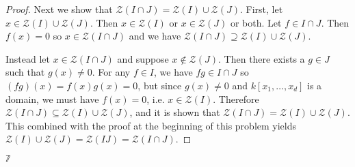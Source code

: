 \documentclass[11pt,oneside,english]{amsart}
\theoremstyle{definition}
\newcommand{\MC}[1]{\mathcal{#1}}
\begin{document}
\begin{enumerate}[leftmargin=*]
\begin{enumerate}
\begin{proof}
Next we show that $\MC{Z}(I\cap J)=\MC{Z}(I)\cup \MC{Z}(J)$. First, let $x\in \MC{Z}(I)\cup\MC{Z}(J)$. Then $x\in \MC{Z}(I)$ or $x\in \MC{Z}(J)$ or both. Let $f\in I\cap J$. Then $f(x)=0$ so $x\in \MC{Z}(I\cap J)$ and we have $\MC{Z}(I\cap J)\supseteq\MC{Z}(I)\cup \MC{Z}(J)$. 

Instead let $x\in \MC{Z}(I\cap J)$ and suppose $x\notin\MC{Z}(J)$. Then there exists a $g\in J$ such that $g(x)\neq0$. For any $f\in I$, we have $fg\in I\cap J$ so $(fg)(x)=f(x)g(x)=0$, but since $g(x)\neq0$ and $k[x_1,\ldots,x_d]$ is a domain, we must have $f(x)=0$, i.e. $x\in \MC{Z}(I)$. Therefore $\MC{Z}(I\cap J)\subseteq\MC{Z}(I)\cup \MC{Z}(J)$, and it is shown that $\MC{Z}(I\cap J)=\MC{Z}(I)\cup \MC{Z}(J)$. This combined with the proof at the beginning of this problem yields $\MC{Z}(I) \cup \MC{Z}(J) = \MC{Z}(IJ) = \MC{Z}(I \cap J)$.
\end{proof}
$\mathbb{7}$
\end{enumerate}
\end{enumerate}
\end{document}
